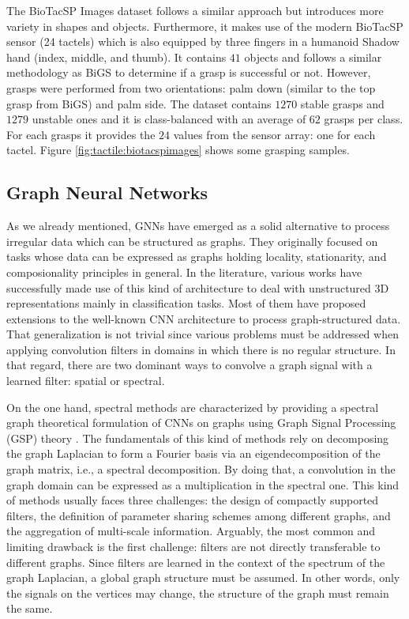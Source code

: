 The BioTacSP Images dataset \cite{Zapata2018} follows a similar approach but introduces more variety in shapes and objects. Furthermore, it makes use of the modern BioTacSP sensor (24 tactels) which is also equipped by three fingers in a humanoid Shadow hand (index, middle, and thumb). It contains $41$ objects and follows a similar methodology as \ac{BiGS} to determine if a grasp is successful or not. However, grasps were performed from two orientations: palm down (similar to the top grasp from \ac{BiGS}) and palm side. The dataset contains $1270$ stable grasps and $1279$ unstable ones and it is class-balanced with an average of $62$ grasps per class. For each grasps it provides the $24$ values from the sensor array: one for each tactel. Figure \ref{fig:tactile:biotacspimages} shows some grasping samples.

\subsection{Graph Neural Networks}
\label{cha:tactile:sec:relatedworks:subsec:gcns}

As we already mentioned, \acp{GNN} have emerged as a solid alternative to process irregular data which can be structured as graphs. They originally focused on tasks whose data can be expressed as graphs holding locality, stationarity, and composionality principles in general. In the literature, various works have successfully made use of this kind of architecture to deal with unstructured \acs{3D} representations mainly in classification tasks. Most of them  have proposed extensions to the well-known \ac{CNN} architecture to process graph-structured data. That generalization is not trivial since various problems must be addressed when applying convolution filters in domains in which there is no regular structure. In that regard, there are two dominant ways to convolve a graph signal with a learned filter: spatial or spectral.

On the one hand, spectral methods are characterized by providing a spectral graph theoretical formulation of CNNs on graphs using Graph Signal Processing (GSP) theory \cite{Shuman2013}. The fundamentals of this kind of methods rely on decomposing the graph Laplacian to form a Fourier basis via an eigendecomposition of the graph matrix, i.e., a spectral decomposition. By doing that, a convolution in the graph domain can be expressed as a multiplication in the spectral one. This kind of methods usually faces three challenges: the design of compactly supported filters, the definition of parameter sharing schemes among different graphs, and the aggregation of multi-scale information. Arguably, the most common and limiting drawback is the first challenge: filters are not directly transferable to different graphs. Since filters are learned in the context of the spectrum of the graph Laplacian, a global graph structure must be assumed. In other words, only the signals on the vertices may change, the structure of the graph must remain the same.

